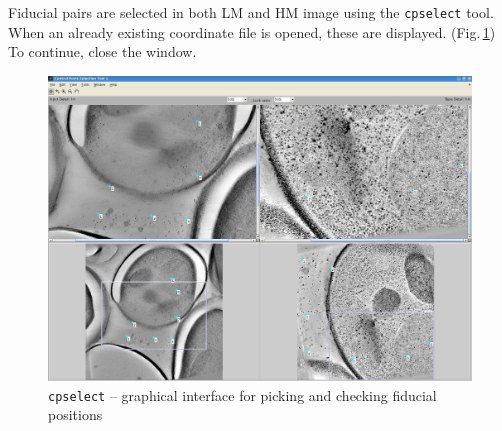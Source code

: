 \documentclass[10pt,a4paper,onepage,DIV12]{scrartcl}
\begin{document}
Fiducial pairs are selected in both LM and HM image using the \texttt{cpselect} tool. When an already existing coordinate file is opened, these are displayed. (Fig.\,\ref{fig:cpsel_HM}) To continue, close the window.
\begin{figure}
 \centering
 \includegraphics[width=.78\textwidth]{images/cpsel_HM.jpg}
 \caption{\texttt{cpselect} -- graphical interface for picking and checking fiducial positions}
 \label{fig:cpsel_HM}
\end{figure}
\end{document}
